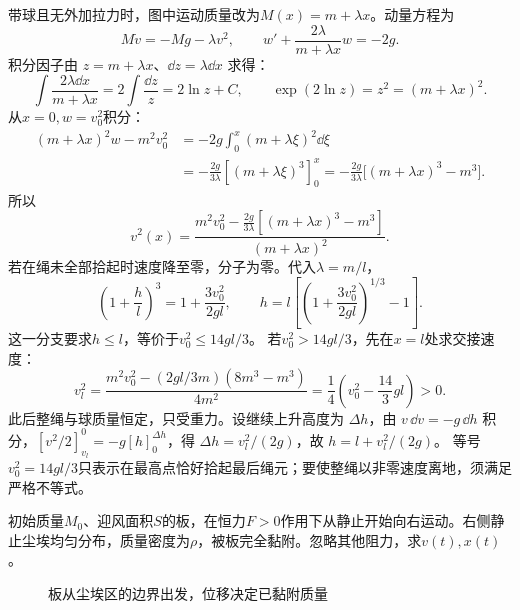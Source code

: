 \begin{solution}
带球且无外加拉力时，图中运动质量改为$M(x)=m+\lambda x$。动量方程为
\[
 M\dot v=-Mg-\lambda v^2,\qquad
 w'+\frac{2\lambda}{m+\lambda x}w=-2g.
\]
积分因子由 $z=m+\lambda x$、$\dd z=\lambda\dd x$ 求得：
\[
\int\frac{2\lambda\dd x}{m+\lambda x}=2\int\frac{\dd z}z
=2\ln z+C,
\qquad \exp(2\ln z)=z^2=(m+\lambda x)^2.
\]
从$x=0,w=v_0^2$积分：
\[
 \begin{aligned}
 (m+\lambda x)^2w-m^2v_0^2
 &=-2g\int_0^x(m+\lambda\xi)^2\dd\xi\\
 &=-\frac{2g}{3\lambda}[(m+\lambda\xi)^3]_0^x
 =-\frac{2g}{3\lambda}\big[(m+\lambda x)^3-m^3\big].
 \end{aligned}
\]
所以
\[
 v^2(x)=
 \frac{m^2v_0^2-\frac{2g}{3\lambda}[(m+\lambda x)^3-m^3]}
 {(m+\lambda x)^2}.
\]
若在绳未全部拾起时速度降至零，分子为零。代入$\lambda=m/l$，
\[
 \left(1+\frac hl\right)^3=1+\frac{3v_0^2}{2gl},\qquad
 \boxed{h=l\left[\left(1+\frac{3v_0^2}{2gl}\right)^{1/3}-1\right]}.
\]
这一分支要求$h\le l$，等价于$v_0^2\le14gl/3$。
若$v_0^2>14gl/3$，先在$x=l$处求交接速度：
\[
 v_l^2=\frac{m^2v_0^2-(2gl/3m)(8m^3-m^3)}{4m^2}
 =\frac14\left(v_0^2-\frac{14}{3}gl\right)>0.
\]
此后整绳与球质量恒定，只受重力。设继续上升高度为 $\Delta h$，由 $v\,\dd v=-g\,\dd h$ 积分，$[v^2/2]_{v_l}^{0}=-g[h]_0^{\Delta h}$，得 $\Delta h=v_l^2/(2g)$，故
$\boxed{h=l+v_l^2/(2g)}$。
等号$v_0^2=14gl/3$只表示在最高点恰好拾起最后绳元；要使整绳以非零速度离地，须满足严格不等式。
\end{solution}



\begin{example}[恒力推动拾尘板]\label{ex:hw3-3}

初始质量$M_0$、迎风面积$S$的板，在恒力$F>0$作用下从静止开始向右运动。右侧静止尘埃均匀分布，质量密度为$\rho$，被板完全黏附。忽略其他阻力，求$v(t),x(t)$。

\end{example}


\begin{figure}[H]\centering
{}
\caption{板从尘埃区的边界出发，位移决定已黏附质量}\label{fig:hw3-3-q}
\end{figure}

